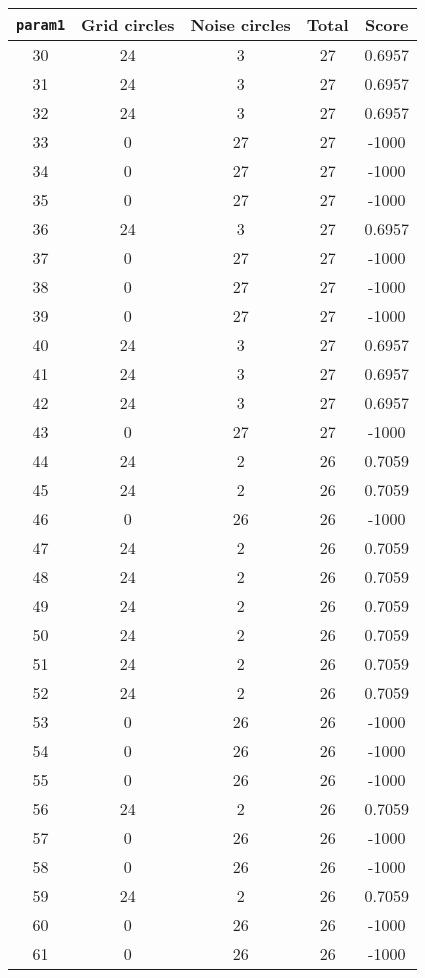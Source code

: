 \documentclass[letterpaper, 12pt]{article}
\begin{document}
\begin{longtable}{|c|c|c|c|c|}
\hline
\textbf{\texttt{param1}} & \textbf{Grid circles} & \textbf{Noise circles} & \textbf{Total} & \textbf{Score} \\
\hline
30 & 24 & 3 & 27 & 0.6957 \\
\hline
31 & 24 & 3 & 27 & 0.6957 \\
\hline
32 & 24 & 3 & 27 & 0.6957 \\
\hline
33 & 0 & 27 & 27 & -1000 \\
\hline
34 & 0 & 27 & 27 & -1000 \\
\hline
35 & 0 & 27 & 27 & -1000 \\
\hline
36 & 24 & 3 & 27 & 0.6957 \\
\hline
37 & 0 & 27 & 27 & -1000 \\
\hline
38 & 0 & 27 & 27 & -1000 \\
\hline
39 & 0 & 27 & 27 & -1000 \\
\hline
40 & 24 & 3 & 27 & 0.6957 \\
\hline
41 & 24 & 3 & 27 & 0.6957 \\
\hline
42 & 24 & 3 & 27 & 0.6957 \\
\hline
43 & 0 & 27 & 27 & -1000 \\
\hline
44 & 24 & 2 & 26 & 0.7059 \\
\hline
45 & 24 & 2 & 26 & 0.7059 \\
\hline
46 & 0 & 26 & 26 & -1000 \\
\hline
47 & 24 & 2 & 26 & 0.7059 \\
\hline
48 & 24 & 2 & 26 & 0.7059 \\
\hline
49 & 24 & 2 & 26 & 0.7059 \\
\hline
50 & 24 & 2 & 26 & 0.7059 \\
\hline
51 & 24 & 2 & 26 & 0.7059 \\
\hline
52 & 24 & 2 & 26 & 0.7059 \\
\hline
53 & 0 & 26 & 26 & -1000 \\
\hline
54 & 0 & 26 & 26 & -1000 \\
\hline
55 & 0 & 26 & 26 & -1000 \\
\hline
56 & 24 & 2 & 26 & 0.7059 \\
\hline
57 & 0 & 26 & 26 & -1000 \\
\hline
58 & 0 & 26 & 26 & -1000 \\
\hline
59 & 24 & 2 & 26 & 0.7059 \\
\hline
60 & 0 & 26 & 26 & -1000 \\
\hline
61 & 0 & 26 & 26 & -1000 \\

\end{longtable}
\end{document}
